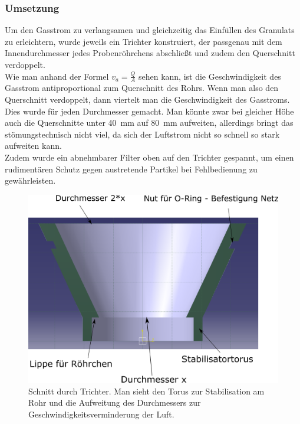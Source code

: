 \subsubsection{Umsetzung}

Um den Gasstrom zu verlangsamen und gleichzeitig das Einfüllen des Granulats zu erleichtern, wurde jeweils ein Trichter konstruiert, der passgenau mit dem Innendurchmesser jedes Probenröhrchens abschließt und zudem den Querschnitt verdoppelt. \\
Wie man anhand der Formel $v_a = \frac{Q}{A}$ \cite{Grollius2012} sehen kann, ist die Geschwindigkeit des Gasstrom antiproportional zum Querschnitt des Rohrs. Wenn man also den Querschnitt verdoppelt, dann viertelt man die Geschwindigkeit des Gasstroms. Dies wurde für jeden Durchmesser gemacht. Man könnte zwar bei gleicher Höhe auch die Querschnitte unter \SI{40}{mm} auf \SI{80}{mm} aufweiten, allerdings bringt das stömungstechnisch nicht viel, da sich der Luftstrom nicht so schnell so stark aufweiten kann. \\
Zudem wurde ein abnehmbarer Filter oben auf den Trichter gespannt, um einen rudimentären Schutz gegen austretende Partikel bei Fehlbedienung zu gewährleisten.

\begin{figure}[h!]
	\begin{center}
		\includegraphics[scale=0.4]{Schnitt_Trichter.png}
		\caption[Skizze Trichter]{Schnitt durch Trichter. Man sieht den Torus zur Stabilisation am Rohr und die Aufweitung des Durchmessers zur Geschwindigkeitsverminderung der Luft.}
	\end{center}
\end{figure}


